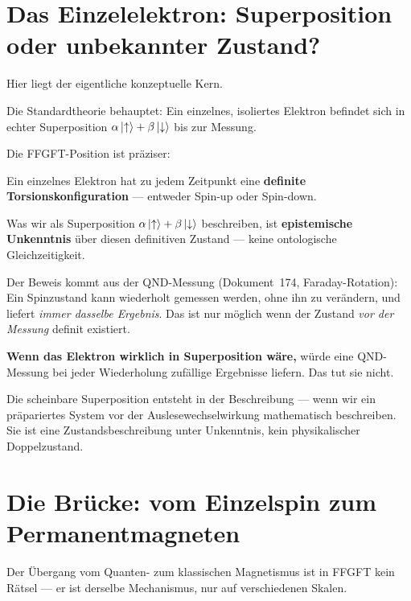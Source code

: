 \section{Das Einzelelektron: Superposition oder unbekannter Zustand?}
\label{sec:einzelelektron}

Hier liegt der eigentliche konzeptuelle Kern.

Die Standardtheorie behauptet: Ein einzelnes, isoliertes Elektron
befindet sich in echter Superposition
$\alpha\left|\uparrow\right\rangle + \beta\left|\downarrow\right\rangle$
bis zur Messung.

Die FFGFT-Position ist präziser:

\begin{foundation}
Ein einzelnes Elektron hat zu jedem Zeitpunkt eine
\textbf{definite Torsionskonfiguration} ---
entweder Spin-up oder Spin-down.

Was wir als Superposition $\alpha\left|\uparrow\right\rangle + \beta\left|\downarrow\right\rangle$
beschreiben, ist \textbf{epistemische Unkenntnis} über diesen
definitiven Zustand --- keine ontologische Gleichzeitigkeit.

Der Beweis kommt aus der QND-Messung (Dokument~174,
Faraday-Rotation): Ein Spinzustand kann wiederholt gemessen werden,
ohne ihn zu verändern, und liefert \emph{immer dasselbe Ergebnis}.
Das ist nur möglich wenn der Zustand \emph{vor der Messung}
definit existiert.

\textbf{Wenn das Elektron wirklich in Superposition wäre,}
würde eine QND-Messung bei jeder Wiederholung zufällige Ergebnisse
liefern. Das tut sie nicht.
\end{foundation}

Die scheinbare Superposition entsteht in der Beschreibung ---
wenn wir ein präpariertes System vor der Auslesewechselwirkung
mathematisch beschreiben.
Sie ist eine Zustandsbeschreibung unter Unkenntnis,
kein physikalischer Doppelzustand.

\section{Die Brücke: vom Einzelspin zum Permanentmagneten}
\label{sec:bruecke}

Der Übergang vom Quanten- zum klassischen Magnetismus
ist in FFGFT kein Rätsel --- er ist derselbe Mechanismus,
nur auf verschiedenen Skalen.


